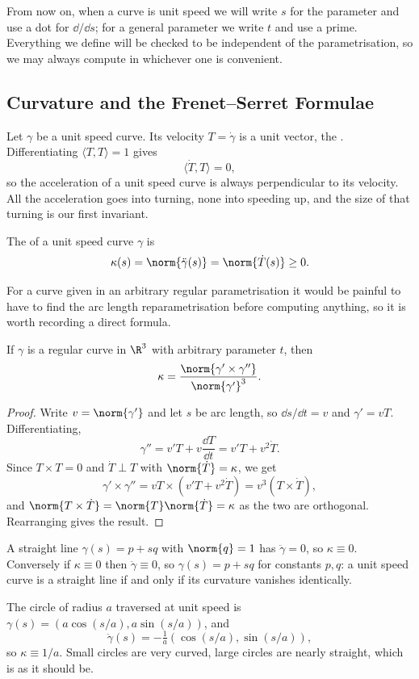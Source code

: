 From now on, when a curve is unit speed we will write $s$ for the parameter and use a dot for $\dd/\dd s$; for a general parameter we write $t$ and use a prime. Everything we define will be checked to be independent of the parametrisation, so we may always compute in whichever one is convenient.

\subsection{Curvature and the Frenet--Serret Formulae}

Let $\gamma$ be a unit speed curve. Its velocity $T = \dot\gamma$ is a unit vector, the . Differentiating $\langle T, T \rangle = 1$ gives
$$
\langle \dot T, T \rangle = 0,
$$
so the acceleration of a unit speed curve is always perpendicular to its velocity. All the acceleration goes into turning, none into speeding up, and the size of that turning is our first invariant.

\begin{definition}[Curvature]
    The  of a unit speed curve $\gamma$ is
    $$
    \kappa(s) = \norm{\ddot\gamma(s)} = \norm{\dot T(s)} \geq 0.
    $$
\end{definition}

For a curve given in an arbitrary regular parametrisation it would be painful to have to find the arc length reparametrisation before computing anything, so it is worth recording a direct formula.

\begin{proposition}
    If $\gamma$ is a regular curve in $\R^3$ with arbitrary parameter $t$, then
    $$
    \kappa = \frac{\norm{\gamma' \times \gamma''}}{\norm{\gamma'}^3}.
    $$
\end{proposition}
\begin{proof}
    Write $v = \norm{\gamma'}$ and let $s$ be arc length, so $\dd s/\dd t = v$ and $\gamma' = v T$. Differentiating,
    $$
    \gamma'' = v' T + v \frac{\dd T}{\dd t} = v' T + v^2 \dot T.
    $$
    Since $T \times T = 0$ and $\dot T \perp T$ with $\norm{\dot T} = \kappa$, we get
    $$
    \gamma' \times \gamma'' = v T \times (v' T + v^2 \dot T) = v^3 (T \times \dot T),
    $$
    and $\norm{T \times \dot T} = \norm{T}\norm{\dot T} = \kappa$ as the two are orthogonal. Rearranging gives the result.
\end{proof}

\begin{example}
    A straight line $\gamma(s) = p + s q$ with $\norm{q} = 1$ has $\ddot\gamma = 0$, so $\kappa \equiv 0$. Conversely if $\kappa \equiv 0$ then $\ddot \gamma \equiv 0$, so $\gamma(s) = p + sq$ for constants $p, q$: a unit speed curve is a straight line if and only if its curvature vanishes identically.

    The circle of radius $a$ traversed at unit speed is $\gamma(s) = (a \cos(s/a), a \sin(s/a))$, and
    $$
    \ddot\gamma(s) = -\tfrac{1}{a}\left(\cos(s/a), \sin(s/a)\right),
    $$
    so $\kappa \equiv 1/a$. Small circles are very curved, large circles are nearly straight, which is as it should be.
\end{example}

